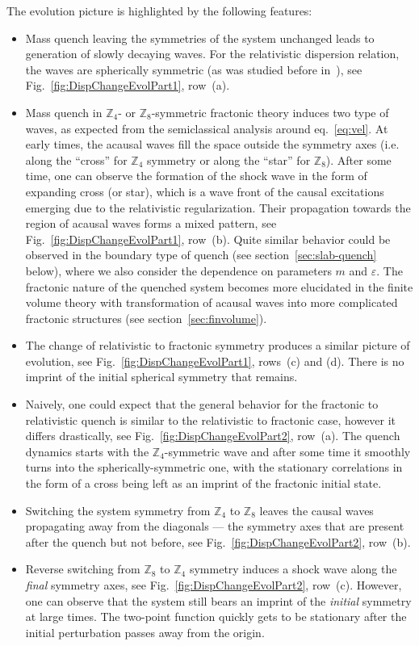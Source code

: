 \documentclass[a4paper,12pt]{article}
\newcommand{\eps}{\varepsilon}
\newcommand{\Z}[1]{\mathbb{Z}_{#1}}
\newcommand{\figref}[1]{Fig.~\ref{#1}}
\newcommand{\secref}[1]{section~\ref{#1}}
\begin{document}
The evolution picture is highlighted by the following features:
\begin{itemize}
    \item Mass quench leaving the symmetries of the system unchanged leads to generation of slowly decaying waves. For the relativistic dispersion relation, the waves are spherically symmetric (as was studied before in~\cite{Calabrese:2007rg, Sotiriadis:2010si}), see \figref{fig:DispChangeEvolPart1}, row~(a).
    
    \item Mass quench in $\Z4$- or $\Z8$-symmetric fractonic theory induces two type of waves, as expected from the semiclassical analysis around eq.~\eqref{eq:vel}. At early times, the acausal waves fill the space outside the symmetry axes (i.e. along the ``cross'' for $\Z4$ symmetry or along the ``star'' for $\Z8$). After some time, one can observe the formation of the shock wave in the form of expanding cross (or star), which is a wave front of the causal excitations emerging due to the relativistic regularization. Their propagation towards the region of acausal waves forms a mixed pattern, see \figref{fig:DispChangeEvolPart1}, row~(b). Quite similar behavior could be observed in the boundary type of quench (see \secref{sec:slab-quench} below), where we also consider the dependence on parameters $m$ and $\eps$. The fractonic nature of the quenched system becomes more elucidated in the finite volume theory with transformation of acausal waves into more complicated fractonic structures (see \secref{sec:finvolume}).
    
    \item The change of relativistic to fractonic symmetry produces a similar picture of evolution, see \figref{fig:DispChangeEvolPart1}, rows~(c) and (d). There is no imprint of the initial spherical symmetry that remains.
    
    \item Naively, one could expect that the general behavior for the fractonic to relativistic quench is similar to the relativistic to fractonic case, however it differs drastically, see \figref{fig:DispChangeEvolPart2}, row~(a). The quench dynamics starts with the $\Z4$-symmetric wave and after some time it smoothly turns into the spherically-symmetric one, with the stationary correlations in the form of a cross being left as an imprint of the fractonic initial state.

    \item Switching the system symmetry from $\Z4$ to $\Z8$ leaves the causal waves propagating away from the diagonals --- the symmetry axes that are present after the quench but not before, see \figref{fig:DispChangeEvolPart2}, row~(b).
    
    \item Reverse switching from $\Z8$ to $\Z4$ symmetry induces a shock wave along the \textit{final} symmetry axes, see \figref{fig:DispChangeEvolPart2}, row~(c). However, one can observe that the system still bears an imprint of the \textit{initial} symmetry at large times. The two-point function quickly gets to be stationary after the initial perturbation passes away from the origin.
\end{itemize}
\end{document}
